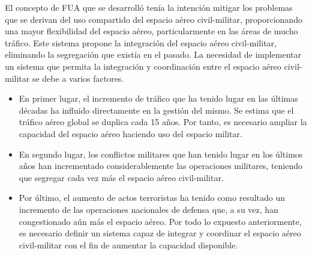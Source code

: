 El concepto de FUA que se desarrolló tenía la intención mitigar los problemas que se derivan del uso compartido del espacio aéreo civil-militar, proporcionando una mayor flexibilidad del   espacio aéreo, particularmente en las áreas de mucho tráfico. Este sistema propone la integración del espacio aéreo civil-militar, eliminando la segregación que existía en el pasado. 
La necesidad de implementar un sistema que permita la integración y coordinación entre el espacio aéreo civil-militar se debe a varios factores.

\begin{itemize}
    \item En primer lugar, el incremento de tráfico que ha tenido lugar en las últimas décadas ha influido directamente en la gestión del mismo. Se estima que el tráfico aéreo global se duplica cada 15 años. Por tanto, es necesario ampliar la capacidad del espacio aéreo haciendo uso del espacio militar.
    \item En segundo lugar, los conflictos militares que han tenido lugar en los últimos años han incrementado considerablemente las operaciones militares, teniendo que segregar cada vez más el espacio aéreo civil-militar.
    \item Por último, el aumento de actos terroristas ha tenido como resultado un incremento de las operaciones nacionales de defensa que, a su vez, han congestionado aún más el espacio aéreo.
Por todo lo expuesto anteriormente, es necesario definir un sistema capaz de integrar y coordinar el espacio aéreo civil-militar con el fin de aumentar la capacidad disponible.
\end{itemize}